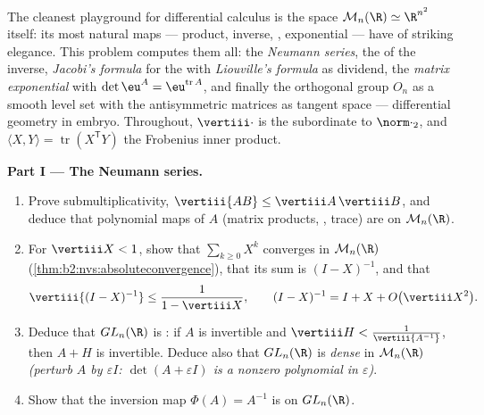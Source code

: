 \begin{problem}\label{pb:b2:diffcalc:1}
The cleanest playground for differential calculus is the space
$\mathcal M_n(\R) \simeq \R^{n^2}$ itself: its most natural maps
--- product, inverse, , exponential --- have
 of striking elegance. This problem computes them
all: the \emph{Neumann series}, the  of the inverse,
\emph{Jacobi's formula} for the
 with \emph{Liouville's formula} as dividend, the
\emph{matrix exponential} with
$\det\eu^A = \eu^{\operatorname{tr}A}$, and finally the
orthogonal group $O_n$ as a smooth level set with the
antisymmetric matrices as tangent space --- differential
geometry in embryo. Throughout, $\vertiii\cdot$ is the  subordinate to $\norm\cdot_2$, and $\langle X, Y\rangle =
\operatorname{tr}(X^{\mathsf T}Y)$ the Frobenius inner product.

\medskip
\noindent\textbf{Part I --- The Neumann series.}
\begin{enumerate}
  \item Prove submultiplicativity, $\vertiii{AB} \leq
        \vertiii A\,\vertiii B$, and deduce that polynomial
        maps of $A$ (matrix products, , trace) are
         on $\mathcal M_n(\R)$.
  \item For $\vertiii X < 1$, show that $\sum_{k\geq0}X^k$
        converges  in $\mathcal M_n(\R)$
        (\cref{thm:b2:nvs:absoluteconvergence}), that its sum
        is $(I - X)^{-1}$, and that
        \[
        \vertiii{(I - X)^{-1}} \leq \frac{1}{1 - \vertiii X},
        \qquad
        (I - X)^{-1} = I + X + O\bigl(\vertiii X^2\bigr) .
        \]
  \item Deduce that $GL_n(\R)$ is \emph{}: if $A$ is
        invertible and $\vertiii H <
        \frac{1}{\vertiii{A^{-1}}}$, then $A + H$ is
        invertible. Deduce also that $GL_n(\R)$ is \emph{dense}
        in $\mathcal M_n(\R)$ \emph{(perturb $A$ by
        $\varepsilon I$: $\det(A + \varepsilon I)$ is a nonzero
        polynomial in $\varepsilon$)}.
  \item Show that the inversion map $\Phi(A) = A^{-1}$ is
         on $GL_n(\R)$.
\end{enumerate}


\end{problem}
